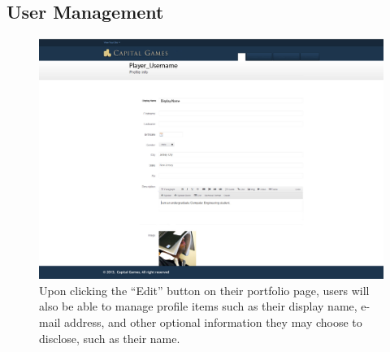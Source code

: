 \subsection{User Management}
{
\begin{figure}
\centering
\includegraphics[width=5.5in]{./mockups/JPEG/ProfileManagement.jpg}
\caption{Upon clicking the ``Edit'' button on their portfolio page, users will also be able to manage profile items such as their display name, e-mail address, and other optional information they may choose to disclose, such as their name.}
\end{figure}
}

